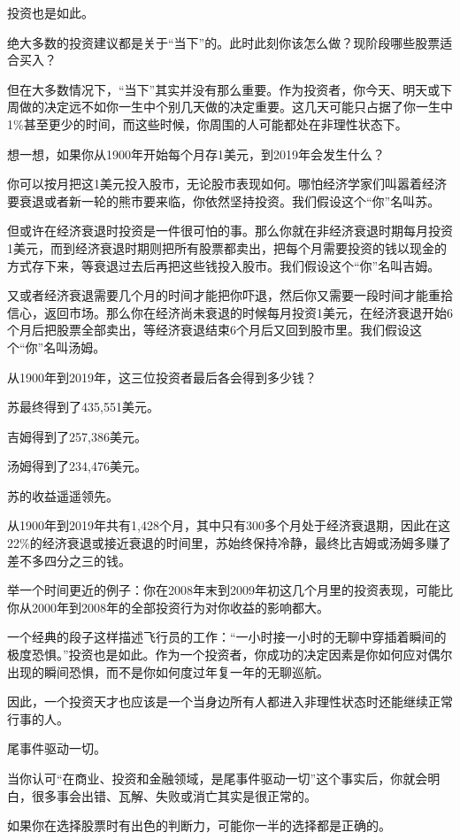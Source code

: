 投资也是如此。

绝大多数的投资建议都是关于“当下”的。此时此刻你该怎么做？现阶段哪些股票适合买入？

但在大多数情况下，“当下”其实并没有那么重要。作为投资者，你今天、明天或下周做的决定远不如你一生中个别几天做的决定重要。这几天可能只占据了你一生中1\%甚至更少的时间，而这些时候，你周围的人可能都处在非理性状态下。

想一想，如果你从1900年开始每个月存1美元，到2019年会发生什么？

你可以按月把这1美元投入股市，无论股市表现如何。哪怕经济学家们叫嚣着经济要衰退或者新一轮的熊市要来临，你依然坚持投资。我们假设这个“你”名叫苏。

但或许在经济衰退时投资是一件很可怕的事。那么你就在非经济衰退时期每月投资1美元，而到经济衰退时期则把所有股票都卖出，把每个月需要投资的钱以现金的方式存下来，等衰退过去后再把这些钱投入股市。我们假设这个“你”名叫吉姆。

又或者经济衰退需要几个月的时间才能把你吓退，然后你又需要一段时间才能重拾信心，返回市场。那么你在经济尚未衰退的时候每月投资1美元，在经济衰退开始6个月后把股票全部卖出，等经济衰退结束6个月后又回到股市里。我们假设这个“你”名叫汤姆。

从1900年到2019年，这三位投资者最后各会得到多少钱？

苏最终得到了435,551美元。

吉姆得到了257,386美元。

汤姆得到了234,476美元。

苏的收益遥遥领先。

从1900年到2019年共有1,428个月，其中只有300多个月处于经济衰退期，因此在这22\%的经济衰退或接近衰退的时间里，苏始终保持冷静，最终比吉姆或汤姆多赚了差不多四分之三的钱。

举一个时间更近的例子：你在2008年末到2009年初这几个月里的投资表现，可能比你从2000年到2008年的全部投资行为对你收益的影响都大。

一个经典的段子这样描述飞行员的工作：“一小时接一小时的无聊中穿插着瞬间的极度恐惧。”投资也是如此。作为一个投资者，你成功的决定因素是你如何应对偶尔出现的瞬间恐惧，而不是你如何度过年复一年的无聊巡航。

因此，一个投资天才也应该是一个当身边所有人都进入非理性状态时还能继续正常行事的人。

尾事件驱动一切。

当你认可“在商业、投资和金融领域，是尾事件驱动一切”这个事实后，你就会明白，很多事会出错、瓦解、失败或消亡其实是很正常的。

如果你在选择股票时有出色的判断力，可能你一半的选择都是正确的。

